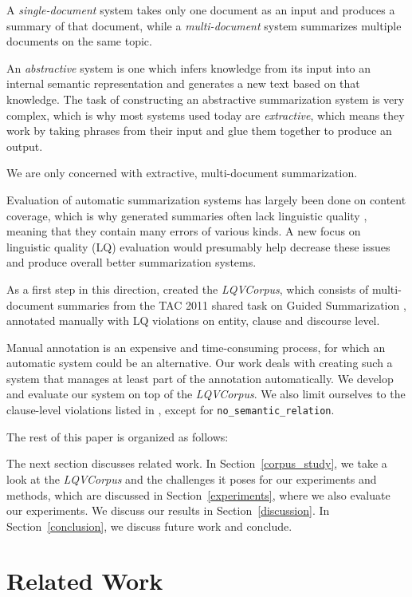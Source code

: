 \documentclass[a4paper,10pt]{scrartcl}
\theoremstyle{style}
\begin{document}
A \textit{single-document} system takes only one document as an input and produces a summary of that document, while a \textit{multi-document} system summarizes multiple documents on the same topic.

An \textit{abstractive} system is one which infers knowledge from its input into an internal semantic representation and generates a new text based on that knowledge. The task of constructing an abstractive summarization system is very complex, which is why most systems used today are \textit{extractive}, which means they work by taking phrases from their input and glue them together to produce an output.

We are only concerned with extractive, multi-document summarization.

Evaluation of automatic summarization systems has largely been done on content coverage, which is why generated summaries often lack linguistic quality \citep{nenkova2011foundations}, meaning that they contain many errors of various kinds. A new focus on linguistic quality (LQ) evaluation would presumably help decrease these issues and produce overall better summarization systems.

As a first step in this direction, \cite{friedrichlqvsumm} created the \textit{LQVCorpus}, which consists of multi-document summaries from the TAC 2011 shared task on Guided Summarization \citep{owczarzak2011overview}, annotated manually with LQ violations on entity, clause and discourse level.

Manual annotation is an expensive and time-consuming process, for which an automatic system could be an alternative. Our work deals with creating such a system that manages at least part of the annotation automatically. We develop and evaluate our system on top of the \textit{LQVCorpus}. We also limit ourselves to the clause-level violations listed in \cite{friedrichlqvsumm}, except for \texttt{no\_semantic\_relation}.

The rest of this paper is organized as follows:

The next section discusses related work. In Section~\ref{corpus_study}, we take a look at the \textit{LQVCorpus} and the challenges it poses for our experiments and methods, which are discussed in Section~\ref{experiments}, where we also evaluate our experiments. We discuss our results in Section~\ref{discussion}. In Section~\ref{conclusion}, we discuss future work and conclude.

\section{Related Work}
\label{related_work}
\end{document}
